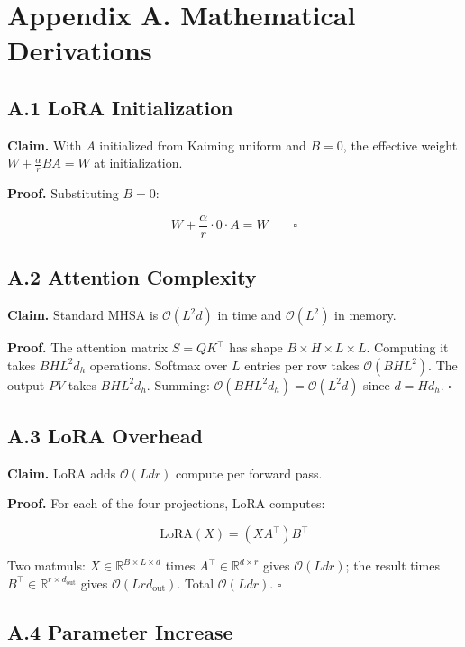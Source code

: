 
\section{Appendix A. Mathematical Derivations}

\subsection{A.1 LoRA Initialization}

\textbf{Claim.} With $A$ initialized from Kaiming uniform and $B = 0$, the 
effective weight $W + \frac{\alpha}{r} B A = W$ at initialization.

\textbf{Proof.} Substituting $B = 0$:

\[
W + \frac{\alpha}{r} \cdot 0 \cdot A = W \qquad \square
\]

\subsection{A.2 Attention Complexity}

\textbf{Claim.} Standard MHSA is $\mathcal{O}(L^2 d)$ in time and $\mathcal{O}(L^2)$ 
in memory.

\textbf{Proof.} The attention matrix $S = Q K^\top$ has shape $B \times H \times L \times L$. 
Computing it takes $B H L^2 d_h$ operations. Softmax over $L$ entries per 
row takes $\mathcal{O}(B H L^2)$. The output $P V$ takes $B H L^2 d_h$. 
Summing: $\mathcal{O}(B H L^2 d_h) = \mathcal{O}(L^2 d)$ since $d = H d_h$. $\square$

\subsection{A.3 LoRA Overhead}

\textbf{Claim.} LoRA adds $\mathcal{O}(L d r)$ compute per forward pass.

\textbf{Proof.} For each of the four projections, LoRA computes:

\[
\text{LoRA}(X) = (X A^\top) B^\top
\]

Two matmuls: $X \in \mathbb{R}^{B \times L \times d}$ times $A^\top \in \mathbb{R}^{d \times r}$ 
gives $\mathcal{O}(L d r)$; the result times $B^\top \in \mathbb{R}^{r \times d_\text{out}}$ 
gives $\mathcal{O}(L r d_\text{out})$. Total $\mathcal{O}(L d r)$. $\square$

\subsection{A.4 Parameter Increase}

